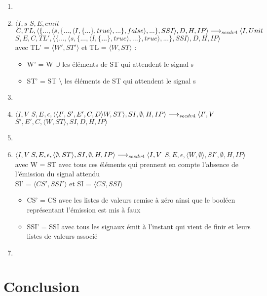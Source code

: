 \documentclass[10pt,a4paper]{article}
\begin{document}
\begin{enumerate}
				\item[]	
				\item $\langle I,s$ $S,E,emit$ $C,TL,\langle \{...,\langle s,\{...,\langle I,\{...\},true\rangle,...\},false\rangle,...\},SSI\rangle,D,H,IP\rangle 
				\\\longrightarrow_{secdv4} \langle I,Unit$ $S,E,C,TL',\langle \{...,\langle s,\{...,\langle I,\{...\},true\rangle,...\},true\rangle,...\},SSI\rangle,D,H,IP\rangle$\\
				avec TL' = $\langle W',ST'\rangle$ et TL = $\langle W,ST\rangle$ :
				\begin{itemize}
					\item[] W' = W $\cup$ les éléments de ST qui attendent le signal s 
					\item[] ST' = ST $\setminus$ les éléments de ST qui attendent le signal s 
				\end{itemize}
				\item[]
				\item $\langle I,V$ $S,E,\epsilon,\langle\langle I',S',E',C,D\rangle W,ST\rangle,SI,\emptyset,H,IP\rangle 
				\\\longrightarrow_{secdv4} \langle I',V$ $S',E',C,\langle W,ST\rangle,SI,D,H,IP\rangle$
				\item[]
				\item $\langle I,V$ $S,E,\epsilon,\langle\emptyset,ST\rangle,SI,\emptyset,H,IP\rangle 
				\\\longrightarrow_{secdv4} \langle I,V$ $S,E,\epsilon,\langle W,\emptyset\rangle,SI',\emptyset,H,IP\rangle$\\
				avec W = ST avec tous ces éléments qui prennent en compte l'absence de l'émission du signal attendu
				\\ SI' = $\langle CS',SSI'\rangle$ et SI = $\langle CS,SSI\rangle$
				\begin{itemize}
					\item[] CS' = CS avec les listes de valeurs remise à zéro ainsi que le booléen représentant l'émission est mis à faux
					\item[] SSI' = SSI avec tous les signaux émit à l'instant qui vient de finir et leurs listes de valeurs associé
				\end{itemize}
				\item[]
			\end{enumerate}
		\newpage
		\section{Conclusion}
		
\end{document}
